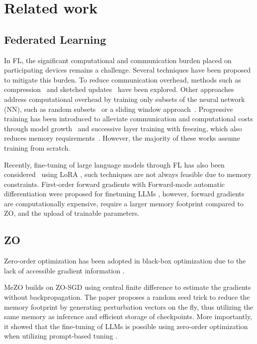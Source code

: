 \section{Related work}


\subsection{Federated Learning}
In FL, the significant computational and communication burden placed on participating devices remains a challenge. Several techniques have been proposed to mitigate this burden. To reduce communication overhead, methods such as compression~\cite{thakker2019compressing} and sketched updates~\cite{shi2020communication} have been explored. Other approaches address computational overhead by training only subsets of the neural network (NN), such as random subsets~\cite{caldas2018expanding} or a sliding window approach~\cite{alam2022fedrolex}. Progressive training has been introduced to alleviate communication and computational costs through model growth~\cite{wang2022progfed} and successive layer training with freezing, which also reduces memory requirements~\cite{pfeiffer2023successive}. However, the majority of these works assume training from scratch. 

Recently, fine-tuning of large language models through FL has also been considered~\cite{babakniya2023slora} using LoRA \cite{hu2022lora}, such techniques are not always feasible due to memory constraints. First-order forward gradients \cite{baydin2022gradients} with Forward-mode automatic differentiation were proposed for finetuning LLMs \cite{spry_cite, FwdLLM}, however, forward gradients are computationally expensive, require a larger memory footprint compared to \ac{ZO}, and the upload of trainable parameters.  



\subsection{\acl{ZO}}

Zero-order optimization has been adopted in black-box optimization due to the lack of accessible gradient information \cite{blackbox_1, blackbox_2}.

MeZO \cite{malladi2023fine} builds on ZO-SGD \cite{spsa_cite} using central finite difference to estimate the gradients without backpropagation. The paper proposes a random seed trick to reduce the memory footprint by generating perturbation vectors on the fly, thus utilizing the same memory as inference and efficient storage of checkpoints. More importantly, it showed that the fine-tuning of LLMs is possible using zero-order optimization when utilizing prompt-based tuning \cite{gao-etal-2021-making}.

